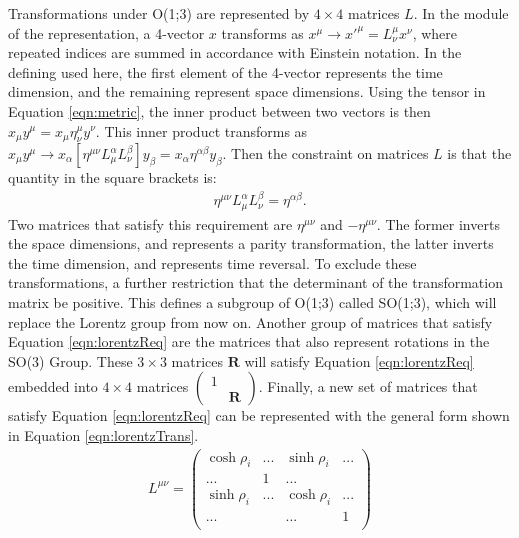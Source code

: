 Transformations under O(1;3) are represented by $4\times4$ matrices $L$.
In the module of the representation, a 4-vector $x$ transforms as $x^\mu\to x'^\mu=L_\nu^\mu x^\nu$, where repeated indices are summed in accordance with Einstein notation.
In the defining used here, the first element of the 4-vector represents the time dimension, and the remaining represent space dimensions.
Using the tensor in Equation \ref{eqn:metric}, the inner product between two vectors is then $x_\mu y^\mu=x_\mu\eta^\mu_\nu y^\nu$.
This inner product transforms as $x_\mu y^\mu\to x_\alpha [\eta^{\mu\nu}L_\mu^\alpha L_\nu^\beta] y_\beta=x_\alpha\eta^{\alpha\beta}y_\beta$.
Then the constraint on matrices $L$ is that the quantity in the square brackets is:
\begin{equation}\begin{split}\label{eqn:lorentzReq}
    \eta^{\mu\nu}L_\mu^\alpha L_\nu^\beta=\eta^{\alpha\beta}.
\end{split}\end{equation} 
Two matrices that satisfy this requirement are $\eta^{\mu\nu}$ and $-\eta^{\mu\nu}$.
The former inverts the space dimensions, and represents a parity transformation, the latter inverts the time dimension, and represents time reversal.
To exclude these transformations, a further restriction that the determinant of the transformation matrix be positive.
This defines a subgroup of O(1;3) called SO(1;3), which will replace the Lorentz group from now on.
Another group of matrices that satisfy Equation \ref{eqn:lorentzReq} are the matrices that also represent rotations in the SO(3) Group.
These $3\times3$ matrices $\pmb R$ will satisfy Equation \ref{eqn:lorentzReq} embedded into $4\times4$ matrices $\begin{pmatrix}1&\\&\pmb R\end{pmatrix}$. \check
Finally, a new set of matrices that satisfy Equation \ref{eqn:lorentzReq} can be represented with the general form shown in Equation \ref{eqn:lorentzTrans}.
\begin{equation}\begin{split}\label{eqn:lorentzTrans}
L^{\mu\nu} = 
\begin{pmatrix}
\cosh\rho_i & ... & \sinh\rho_i & ... \\
... & 1 & ... \\
\sinh\rho_i & ... & \cosh\rho_i & ... \\
... & & ... & 1 \\
\end{pmatrix}
\end{split}\end{equation} 
